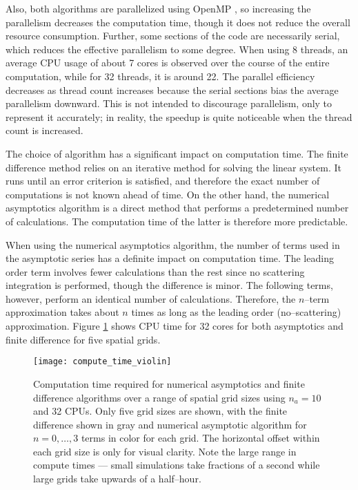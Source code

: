 Also, both algorithms are parallelized using OpenMP \cite{message_passing_interface_forum_mpi:_1993}, so increasing the parallelism decreases the computation time, though it does not reduce the overall resource consumption.
Further, some sections of the code are necessarily serial, which reduces the effective parallelism to some degree.
When using 8 threads, an average CPU usage of about 7 cores is observed over the course of the entire computation, while for 32 threads, it is around 22. 
The parallel efficiency decreases as thread count increases because the serial sections bias the average parallelism downward.
This is not intended to discourage parallelism, only to represent it accurately; in reality, the speedup is quite noticeable when the thread count is increased.

The choice of algorithm has a significant impact on computation time.
The finite difference method relies on an iterative method for solving the linear system.
It runs until an error criterion is satisfied, and therefore the exact number of computations is not known ahead of time.
On the other hand, the numerical asymptotics algorithm is a direct method that performs a predetermined number of calculations.
The computation time of the latter is therefore more predictable.

When using the numerical asymptotics algorithm, the number of terms used in the asymptotic series has a definite impact on computation time.
The leading order term involves fewer calculations than the rest since no scattering integration is performed, though the difference is minor.
The following terms, however, perform an identical number of calculations.
Therefore, the $n$--term approximation takes about $n$ times as long as the leading order (no--scattering) approximation.
Figure \ref{fig:compute_time_violin} shows CPU time for 32 cores for both asymptotics and finite difference for five spatial grids.

\begin{figure}[H]
  \centering
  \texttt{[image: compute\_time\_violin]}
  \caption{Computation time required for numerical asymptotics and finite difference algorithms over a range of spatial grid sizes using $n_a=10$ and 32 CPUs. Only five grid sizes are shown, with the finite difference shown in gray and numerical asymptotic algorithm for $n=0,\ldots,3$ terms in color for each grid. The horizontal offset within each grid size is only for visual clarity. Note the large range in compute times --- small simulations take fractions of a second while large grids take upwards of a half--hour.}
  \label{fig:compute_time_violin}
\end{figure}

